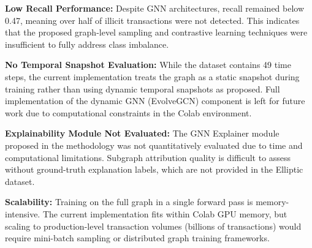 \documentclass[conference]{IEEEtran}
\begin{document}
\textbf{Low Recall Performance:} Despite GNN architectures, recall remained below 0.47, meaning over half of illicit transactions were not detected. This indicates that the proposed graph-level sampling and contrastive learning techniques were insufficient to fully address class imbalance.

\textbf{No Temporal Snapshot Evaluation:} While the dataset contains 49 time steps, the current implementation treats the graph as a static snapshot during training rather than using dynamic temporal snapshots as proposed. Full implementation of the dynamic GNN (EvolveGCN) component is left for future work due to computational constraints in the Colab environment.

\textbf{Explainability Module Not Evaluated:} The GNN Explainer module proposed in the methodology was not quantitatively evaluated due to time and computational limitations. Subgraph attribution quality is difficult to assess without ground-truth explanation labels, which are not provided in the Elliptic dataset.

\textbf{Scalability:} Training on the full graph in a single forward pass is memory-intensive. The current implementation fits within Colab GPU memory, but scaling to production-level transaction volumes (billions of transactions) would require mini-batch sampling or distributed graph training frameworks.
\end{document}
